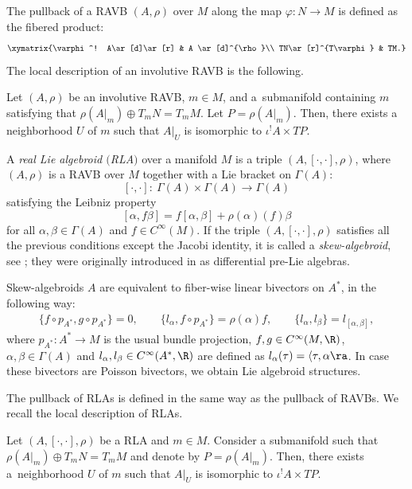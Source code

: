 The pullback of a RAVB $(A, \rho) $ over $M$ along the map $\varphi\colon N\to M$ is defined as the fibered product:
\[
\xymatrix{\varphi^! A\ar[d]\ar[r] & A \ar[d]^{\rho}\\
TN\ar[r]^{T\varphi} & TM.}
\]
The local description of an involutive RAVB is the following.
\begin{Theorem}\label{splitting_ravb}
Let $(A,\rho)$ be an involutive RAVB, $m\in M$, and  a~submanifold containing $m$ satisfying that $\rho(A|_m)\oplus T_m N=T_m M$. Let $P=\rho(A|_m)$. Then, there exists a neighborhood $U$ of $m$ such that $A|_{U}$ is isomorphic to $\iota^! A\times TP$.
\end{Theorem}
\begin{Definition}A {\em real Lie algebroid $($RLA$)$} over a manifold $M$ is a triple $(A, [\cdot, \cdot], \rho)$, where $(A,\rho)$ is a RAVB over $M$ together with a Lie bracket on $\Gamma(A)$:
\[[\cdot,\cdot]\colon\ \Gamma(A)\times \Gamma(A)\to\Gamma(A)\]
satisfying the Leibniz property
\[[\alpha,f\beta]=f[\alpha,\beta]+\rho(\alpha)(f)\beta\]
 for all $\alpha,\beta\in \Gamma(A)$ and $f\in C^{\infty}(M)$. If the triple $(A,[\cdot,\cdot],\rho)$ satisfies all the previous conditions except the Jacobi identity, it is called a {\em skew-algebroid}, see \cite[Definition 4.1]{grabowski2022nonassociative}; they were originally introduced in \cite{kosmann1990poisson} as differential pre-Lie algebras.
\end{Definition}

Skew-algebroids $A$ are equivalent to fiber-wise linear bivectors on $A^*$, in the following way:
\begin{align*}
\{f\circ p_{A^*},g\circ p_{A^*}\}=0,\qquad
\{l_{\alpha}, f\circ p_{A^*}\}=\rho(\alpha)f,\qquad
\{l_{\alpha},l_{\beta}\}=l_{[\alpha,\beta]},
\end{align*}
where $p_{A^*}\colon A^* \to M$ is the usual bundle projection, $f, g\in C^{\infty}(M,\R)$, $\alpha,\beta\in \Gamma(A)$ and ${l_{\alpha}, l_{\beta}\in C^{\infty}(A^*,\R)}$ are defined as $l_{\alpha}(\tau)=\langle\tau,\alpha\ra$. In case these bivectors are Poisson bivectors, we obtain Lie algebroid structures.

The pullback of RLAs is defined in the same way as the pullback of RAVBs. We recall the local description of RLAs.

\begin{Theorem}
 Let $(A,[\cdot,\cdot],\rho)$ be a RLA and $m\in M$. Consider a submanifold  such that $\rho(A|_{m})\oplus T_m N=T_m M$ and denote by $P=\rho(A|_{m})$. Then, there exists a~neighborhood $U$ of $m$ such that $A|_{U}$ is isomorphic to $\iota^! A\times TP$.
\end{Theorem}

